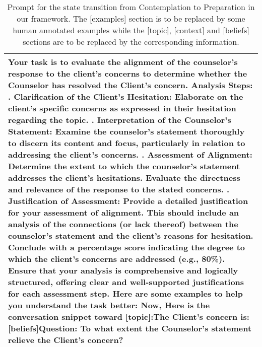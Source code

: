 \begin{table*}[tb]
\begin{tabularx}{\textwidth}{X}
\toprule
Your task is to evaluate the alignment of the counselor's response to the client's concerns to determine whether the Counselor has resolved the Client's concern. \newline Analysis Steps: \newline 1. Clarification of the Client’s Hesitation: Elaborate on the client’s specific concerns as expressed in their hesitation regarding the topic. \newline 2. Interpretation of the Counselor's Statement: Examine the counselor’s statement thoroughly to discern its content and focus, particularly in relation to addressing the client’s concerns. \newline 3. Assessment of Alignment: Determine the extent to which the counselor’s statement addresses the client’s hesitations. Evaluate the directness and relevance of the response to the stated concerns. \newline 4. Justification of Assessment: Provide a detailed justification for your assessment of alignment. This should include an analysis of the connections (or lack thereof) between the counselor’s statement and the client’s reasons for hesitation. Conclude with a percentage score indicating the degree to which the client’s concerns are addressed (e.g., 80\%). \newline Ensure that your analysis is comprehensive and logically structured, offering clear and well-supported justifications for each assessment step. \newline Here are some examples to help you understand the task better: \newline [examples] \newline Now, Here is the conversation snippet toward [topic]:\newline[context] \newline The Client's concern is: [beliefs]\newline Question: To what extent the Counselor's statement relieve the Client's concern? \\ \bottomrule
\end{tabularx}
\caption{Prompt for the state transition from Contemplation to Preparation in our framework. The [examples] section is to be replaced by some human annotated examples while the [topic], [context] and [beliefs] sections are to be replaced by the corresponding information.}
\label{tab:state transition prompt2}
\end{table*}

